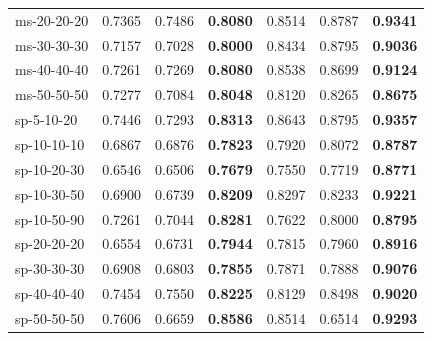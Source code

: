 \begin{table}[!t]
\begin{tabular}{lcccccc}
    ms-20-20-20  & 0.7365 & 0.7486 & \textbf{0.8080} & 0.8514 & 0.8787 & \textbf{0.9341} \\
    ms-30-30-30  & 0.7157 & 0.7028 & \textbf{0.8000} & 0.8434 & 0.8795 & \textbf{0.9036} \\
    ms-40-40-40  & 0.7261 & 0.7269 & \textbf{0.8080} & 0.8538 & 0.8699 & \textbf{0.9124} \\
    ms-50-50-50  & 0.7277 & 0.7084 & \textbf{0.8048} & 0.8120 & 0.8265 & \textbf{0.8675} \\
    \hline\hline
    sp-5-10-20 & 0.7446 & 0.7293 & \textbf{0.8313} & 0.8643 & 0.8795 & \textbf{0.9357} \\
    sp-10-10-10 & 0.6867 & 0.6876 & \textbf{0.7823} & 0.7920 & 0.8072 & \textbf{0.8787} \\
    sp-10-20-30                  & 0.6546   & 0.6506   & \textbf{0.7679}  & 0.7550   & 0.7719                           & \textbf{0.8771} \\
    sp-10-30-50  & 0.6900 & 0.6739 & \textbf{0.8209} & 0.8297 & 0.8233 & \textbf{0.9221} \\
    sp-10-50-90  & 0.7261 & 0.7044 & \textbf{0.8281} & 0.7622 & 0.8000 & \textbf{0.8795} \\
    sp-20-20-20  & 0.6554 & 0.6731 & \textbf{0.7944} & 0.7815 & 0.7960 & \textbf{0.8916} \\
    sp-30-30-30  & 0.6908 & 0.6803 & \textbf{0.7855} & 0.7871 & 0.7888 & \textbf{0.9076} \\
    sp-40-40-40  & 0.7454 & 0.7550 & \textbf{0.8225} & 0.8129 & 0.8498 & \textbf{0.9020} \\
    sp-50-50-50  & 0.7606 & 0.6659 & \textbf{0.8586} & 0.8514 & 0.6514 & \textbf{0.9293} \\
    \hline
    \end{tabular}%
        
    \end{table}
    
